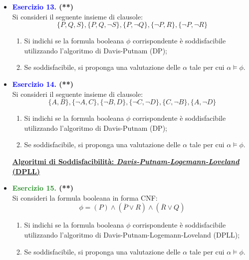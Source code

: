 \documentclass[a4paper,10pt]{article}
\begin{document}
{\begin{itemize}[label=, leftmargin=0pt]
    \item \textbf{\textcolor{blue}{Esercizio 13.} (**)}\\ 	
    Si consideri il seguente insieme di clausole:
    $$\{P, Q, S\}, \{P, Q, \lnot S\}, \{P, \lnot Q\}, \{\lnot P, R\}, \{\lnot P, \lnot R\}$$
    \begin{enumerate}
        \item Si indichi se la formula booleana $\phi$ corrispondente è soddisfacibile utilizzando l'algoritmo di Davis-Putnam (DP);
        \item Se soddisfacibile, si proponga una valutazione delle  $\alpha$ tale per cui $\alpha\models\phi$.\\[0.2cm]
    \end{enumerate}

    \item \textbf{\textcolor{blue}{Esercizio 14.} (**)}\\ 	
    Si consideri il seguente insieme di clausole:
    $$\{A, B\}, \{\lnot A, C\}, \{\lnot B, D\}, \{\lnot C, \lnot D\}, \{C, \lnot B\}, \{A, \lnot D\}$$
    \begin{enumerate}
        \item Si indichi se la formula booleana $\phi$ corrispondente è soddisfacibile utilizzando l'algoritmo di Davis-Putnam (DP);
        \item Se soddisfacibile, si proponga una valutazione delle  $\alpha$ tale per cui $\alpha\models\phi$.\\[0.2cm]
    \end{enumerate}

    \textbf{\underline{Algoritmi di Soddisfacibilità: \textit{Davis-Putnam-Logemann-Loveland} (DPLL)}}

    \item \textbf{\textcolor{ForestGreen}{Esercizio 15.} (**)}\\ 	
    Si consideri la formula booleana in forma CNF:
    $$\phi = (P)\land(\overline P \lor R)\land (\overline R \lor Q)$$
    \begin{enumerate}
        \item Si indichi se la formula booleana $\phi$ corrispondente è soddisfacibile utilizzando l'algoritmo di Davis-Putnam-Logemann-Loveland (DPLL);
        \item Se soddisfacibile, si proponga una valutazione delle  $\alpha$ tale per cui $\alpha\models\phi$.
    \end{enumerate}


\end{itemize}}
\end{document}
